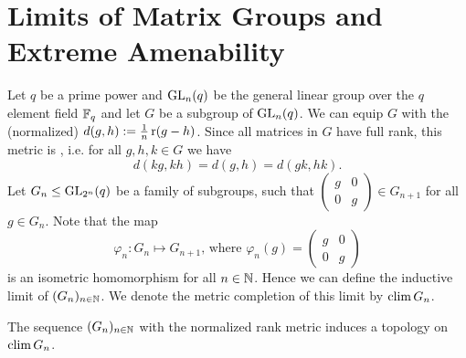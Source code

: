 






\section{Limits of Matrix Groups and Extreme Amenability}\label{sec:generalDefns}
Let $q$ be a prime power and $\operatorname{GL}_n(q)$ be the general linear group over the $q$ element field $\mathbb{F}_q$ and let $G$ be a subgroup of $\operatorname{GL}_n(q)$. We can equip $G$ with the (normalized)  $d(g,h):=\frac{1}{n}\operatorname{r}(g-h)$.
Since all matrices in $G$ have full rank, this metric is , i.e. for all $g,h,k\in G$ we have \[d(kg,kh)=d(g,h)=d(gk,hk).\] 
Let $G_n\leq \operatorname{GL}_{2^n}(q)$ be a family of subgroups, such that 
$\begin{pmatrix}
g &0\\
0&g
\end{pmatrix}\in G_{n+1}$ for all $g\in G_n$. Note that the map
\[\varphi_n\colon G_n\mapsto G_{n+1}\text{, where }\varphi_n(g)=\begin{pmatrix}
g &0\\
0&g
\end{pmatrix}\]
is an isometric homomorphism for all $n\in\mathbb{N}$. Hence we can define the inductive limit of $(G_n)_{n\in\mathbb{N}}$. We denote the metric completion of this limit by $\operatorname{clim} G_n$.%




\begin{lemma}\label{lem:GroupTopo}
The sequence $(G_n)_{n\in\mathbb{N}}$ with the normalized rank metric induces a topology on $\operatorname{clim} G_n$.
\end{lemma}

